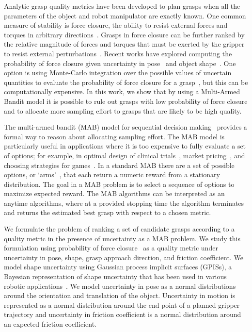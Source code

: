 \documentclass[journal,transmag]{IEEEtran}%
\begin{document}
Analytic grasp quality metrics have been developed to plan grasps when all the parameters of the object and robot manipulator are exactly known.
One common measure of stability is force closure, the ability to resist external forces and torques in arbitrary directions~\cite{li1988task}.
Grasps in force closure can be further ranked by the relative magnitude of forces and torques that must be exerted by the gripper to resist external perturbations~\cite{ferrari1992}.
Recent works have explored computing the probability of  force closure given uncertainty in pose~\cite{christopoulos2007handling, kim2012physically, weisz2012pose} and object shape~\cite{kehoe2012estimating, mahler2015gp}.
One option is using Monte-Carlo integration over the possible values of uncertain quantities to evaluate the probability of force closure for a grasp~\cite{christopoulos2007handling, kim2012physically, weisz2012pose, kehoe2012estimating, kehoe2012towards}, but this can be computationally expensive.
In this work, we show that by using a Multi-Armed Bandit model it is possible to rule out grasps with low probability of force closure and to allocate more sampling effort to grasps that are likely to be high quality.

The multi-armed bandit (MAB) model for sequential decision making~\cite{barto1998reinforcement, lai1985asymptotically, robbins1985some} provides a formal way to reason about allocating sampling effort.
The MAB model is particularly useful in applications where it is too expensive to fully evaluate a set of options; for example, in optimal design of clinical trials~\cite{simon1989optimal}, market pricing~\cite{rothschild1974two}, and choosing strategies for games~\cite{st2012online}.
In a standard MAB there are a set of possible options, or `arms'~\cite{barto1998reinforcement}, that each return a numeric reward from a stationary distribution.
The goal in a MAB problem is to  select a sequence of options to maximize expected reward.  The MAB algorithms can be interpreted as an anytime algorithms, where at a provided stopping time the algorithm terminates and returns the estimated best grasp with respect to a chosen metric. 

We formulate the problem of ranking a set of candidate grasps according to a quality metric in the presence of uncertainty as a MAB problem.
We study this formulation using probability of force closure~\cite{christopoulos2007handling, weisz2012pose, kehoe2012toward} as a quality metric under uncertainty in pose, shape, grasp approach direction, and friction coefficient. 
We model shape uncertainty using Gaussian process implicit surfaces (GPISs), a Bayesian representation of shape uncertainty that has been used in various robotic applications~\cite{dragiev2011, hollinger2013}. 
We model uncertainty in pose as a normal distributions around the orientation and translation of the object.
Uncertainty in motion is represented as a normal distribution around the end point of a planned gripper trajectory and uncertainty in friction coefficient is a normal distribution around an expected friction coefficient.
\end{document}

